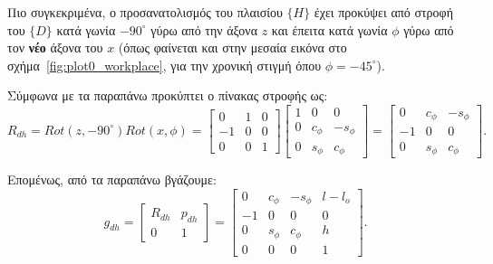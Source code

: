 \documentclass[12pt]{article} %
\numberwithin{equation}{section}  %
\begin{document}
Πιο συγκεκριμένα, ο προσανατολισμός του πλαισίου $\{H\}$ έχει προκύψει από στροφή του $\{D\}$ κατά γωνία $-90^{\circ}$ γύρω από την άξονα $z$ 
και έπειτα κατά γωνία $\phi$ γύρω από τον \textbf{νέο} άξονα του $x$ (όπως φαίνεται και στην μεσαία εικόνα στο σχήμα~\ref{fig:plot0_workplace}, για την χρονική στιγμή όπου $\phi = -45^{\circ}$).

Σύμφωνα με τα παραπάνω προκύπτει ο πίνακας στροφής ως:
\begin{equation}\label{eq:Rdh}
        R_{dh} = Rot(z, -90^{\circ}) Rot(x, \phi) = 
    \begin{bmatrix}
        0        & 1       & 0 \\
        -1     & 0         & 0 \\
        0 &         0       &  1
    \end{bmatrix} \begin{bmatrix}
        1        & 0       & 0 \\
        0     & c_{\phi}         & -s_{\phi} \\
        0 &         s_{\phi}      &  c_{\phi}
    \end{bmatrix} = \begin{bmatrix}
        0    &  c_{\phi}  & -s_{\phi} \\
        -1   &  0         &  0    \\
        0    &  s_{\phi}  &  c_{\phi}
    \end{bmatrix}
    .
\end{equation}

Επομένως, από τα παραπάνω βγάζουμε:
\begin{equation} \label{eq:g_dh}
    g_{dh} = \begin{bmatrix} R_{dh} & p_{dh}  \\ 0 & 1\end{bmatrix} = 
    \begin{bmatrix} 
        0         &  c_{\phi}  & -s_{\phi}  &  l - l_o  \\
        -1        &  0         &  0         &  0  \\
        0         &  s_{\phi}  &  c_{\phi}  &  h  \\
        0         &  0         &  0         &  1  
    \end{bmatrix}.
\end{equation}
\end{document}
